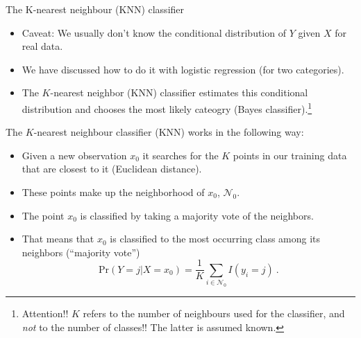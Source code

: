 \documentclass[10pt,ignorenonframetext,]{beamer}
\providecommand{\tightlist}{%
  \setlength{\itemsep}{0pt}\setlength{\parskip}{0pt}}
\begin{document}
\begin{frame}

\begin{block}{The K-nearest neighbour (KNN) classifier}

\vspace{2mm}

\begin{itemize}
\tightlist
\item
  Caveat: We usually don't know the conditional distribution of \(Y\)
  given \(X\) for real data.
\end{itemize}

\vspace{2mm}

\begin{itemize}
\tightlist
\item
  We have discussed how to do it with logistic regression (for two
  categories).
\end{itemize}

\vspace{2mm}

\begin{itemize}
\tightlist
\item
  The \(K\)-nearest neighbor (KNN) classifier estimates this conditional
  distribution and chooses the most likely cateogry (Bayes
  classifier).\footnote{Attention!! $K$ refers to the number of neighbours used for the classifier, and \emph{not} to the number of classes!! The latter is assumed known.}
\end{itemize}

\end{block}

\end{frame}

\begin{frame}

\vspace{2mm} The \(K\)-nearest neighbour classifier (KNN) works in the
following way:

\begin{itemize}
\tightlist
\item
  Given a new observation \(x_0\) it searches for the \(K\) points in
  our training data that are closest to it (Euclidean distance).
\item
  These points make up the neighborhood of \(x_0\), \(\mathcal{N}_0\).
\item
  The point \(x_0\) is classified by taking a majority vote of the
  neighbors.
\item
  That means that \(x_0\) is classified to the most occurring class
  among its neighbors (``majority vote'')
  \[\text{Pr}(Y=j | X = x_0) = \frac{1}{K} \sum_{i \in \mathcal{N}_0} I(y_i = j)\ .\]
\end{itemize}

\end{frame}
\end{document}

